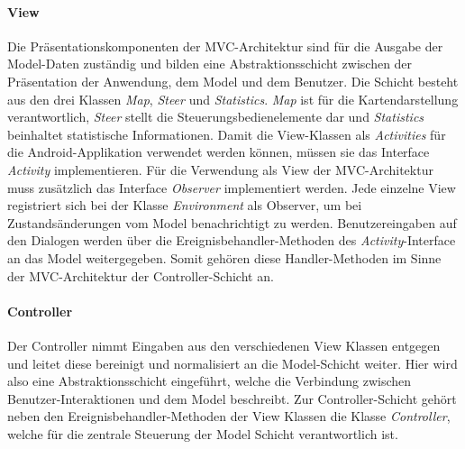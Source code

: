 \documentclass[10pt,a4paper]{article}
\begin{document}
  			\paragraph*{View}
  				Die Präsentationskomponenten der MVC-Architektur sind für die Ausgabe der Model-Daten zuständig und bilden eine
  				Abstraktionsschicht zwischen der Präsentation der Anwendung, dem Model und dem Benutzer. Die Schicht besteht aus den drei
  				Klassen	\textit{Map}, \textit{Steer} und \textit{Statistics}. \textit{Map} ist für die Kartendarstellung
  				verantwortlich, \textit{Steer} stellt die Steuerungsbedienelemente dar und \textit{Statistics} beinhaltet statistische
  				Informationen.  Damit die View-Klassen als \textit{Activities} für die Android-Applikation verwendet werden können, müssen sie
  				das Interface \textit{Activity} implementieren. Für die Verwendung als View der MVC-Architektur muss zusätzlich das Interface
  				\textit{Observer} implementiert werden. Jede einzelne View registriert sich bei der Klasse \textit{Environment} als Observer,
  				um bei Zustandsänderungen vom Model benachrichtigt zu werden. Benutzereingaben auf den Dialogen werden über
  				die Ereignisbehandler-Methoden des \textit{Activity}-Interface an das Model weitergegeben. Somit gehören diese Handler-Methoden
  				im Sinne der MVC-Architektur der Controller-Schicht an.
  			\paragraph*{Controller}
  				Der Controller nimmt Eingaben aus den verschiedenen View Klassen entgegen und leitet diese bereinigt und normalisiert an die
  				Model-Schicht weiter. Hier wird also eine Abstraktionsschicht eingeführt, welche die Verbindung zwischen Benutzer-Interaktionen
  				und dem Model beschreibt. Zur Controller-Schicht gehört neben den Ereignisbehandler-Methoden der View Klassen die Klasse
  				\textit{Controller}, welche für die zentrale Steuerung der Model Schicht verantwortlich ist.
\end{document}
